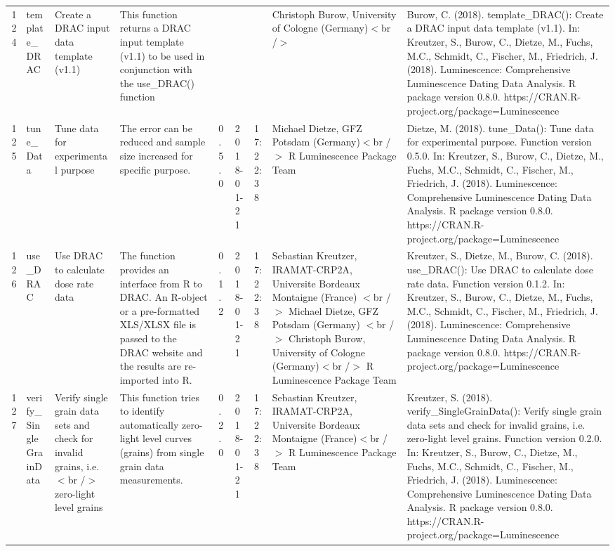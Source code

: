 \begin{table}[ht]
\begin{tabular}{rllllllll}
 \\ 
  124 & template\_DRAC & Create a DRAC input data template (v1.1) & This function returns a DRAC input template (v1.1) to be used in conjunction with the use\_DRAC() function &  &  &  & Christoph Burow, University of Cologne (Germany)$<$br /$>$ & Burow, C. (2018). template\_DRAC(): Create a DRAC input data template (v1.1). In: Kreutzer, S., Burow, C., Dietze, M., Fuchs, M.C., Schmidt, C., Fischer, M., Friedrich, J. (2018). Luminescence: Comprehensive Luminescence Dating Data Analysis. R package version 0.8.0. https://CRAN.R-project.org/package=Luminescence
 \\ 
  125 & tune\_Data & Tune data for experimental purpose & The error can be reduced and sample size increased for specific purpose. & 0.5.0 & 2018-01-21 & 17:22:38
 & Michael Dietze, GFZ Potsdam (Germany)$<$br /$>$  R Luminescence Package Team & Dietze, M. (2018). tune\_Data(): Tune data for experimental purpose. Function version 0.5.0. In: Kreutzer, S., Burow, C., Dietze, M., Fuchs, M.C., Schmidt, C., Fischer, M., Friedrich, J. (2018). Luminescence: Comprehensive Luminescence Dating Data Analysis. R package version 0.8.0. https://CRAN.R-project.org/package=Luminescence
 \\ 
  126 & use\_DRAC & Use DRAC to calculate dose rate data & The function provides an interface from R to DRAC. An R-object or a pre-formatted XLS/XLSX file is passed to the DRAC website and the results are re-imported into R. & 0.1.2 & 2018-01-21 & 17:22:38
 & Sebastian Kreutzer, IRAMAT-CRP2A, Universite Bordeaux Montaigne (France) $<$br /$>$ Michael Dietze, GFZ Potsdam (Germany) $<$br /$>$ Christoph Burow, University of Cologne (Germany)$<$br /$>$  R Luminescence Package Team & Kreutzer, S., Dietze, M., Burow, C. (2018). use\_DRAC(): Use DRAC to calculate dose rate data. Function version 0.1.2. In: Kreutzer, S., Burow, C., Dietze, M., Fuchs, M.C., Schmidt, C., Fischer, M., Friedrich, J. (2018). Luminescence: Comprehensive Luminescence Dating Data Analysis. R package version 0.8.0. https://CRAN.R-project.org/package=Luminescence
 \\ 
  127 & verify\_SingleGrainData & Verify single grain data sets and check for invalid grains, i.e.$<$br /$>$ zero-light level grains & This function tries to identify automatically zero-light level curves (grains) from single grain data measurements. & 0.2.0 & 2018-01-21 & 17:22:38
 & Sebastian Kreutzer, IRAMAT-CRP2A, Universite Bordeaux Montaigne (France)$<$br /$>$  R Luminescence Package Team & Kreutzer, S. (2018). verify\_SingleGrainData(): Verify single grain data sets and check for invalid grains, i.e. zero-light level grains. Function version 0.2.0. In: Kreutzer, S., Burow, C., Dietze, M., Fuchs, M.C., Schmidt, C., Fischer, M., Friedrich, J. (2018). Luminescence: Comprehensive Luminescence Dating Data Analysis. R package version 0.8.0. https://CRAN.R-project.org/package=Luminescence

\end{tabular}
\end{table}

